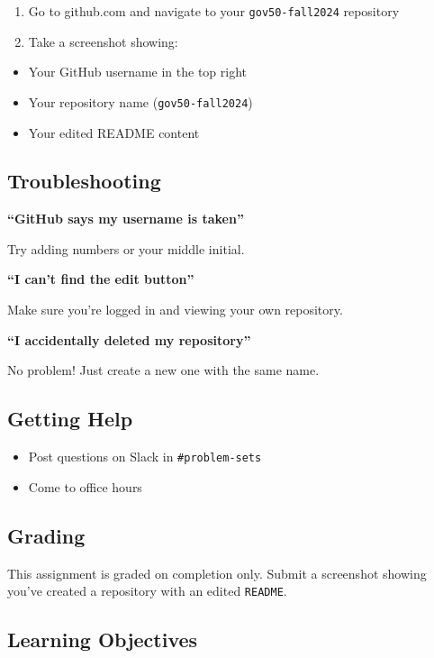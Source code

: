\documentclass[
  11pt,
  letterpaper]{article}
\providecommand{\tightlist}{%
  \setlength{\itemsep}{0pt}\setlength{\parskip}{0pt}}
\begin{document}
\begin{enumerate}
\def\labelenumi{\arabic{enumi}.}
\tightlist
\item
  Go to github.com and navigate to your \texttt{gov50-fall2024}
  repository
\item
  Take a screenshot showing:
\end{enumerate}

\begin{itemize}
\tightlist
\item
  Your GitHub username in the top right
\item
  Your repository name (\texttt{gov50-fall2024})
\item
  Your edited README content
\end{itemize}

\subsection{Troubleshooting}\label{troubleshooting}

\textbf{``GitHub says my username is taken''}

Try adding numbers or your middle initial.

\textbf{``I can't find the edit button''}

Make sure you're logged in and viewing your own repository.

\textbf{``I accidentally deleted my repository''}

No problem! Just create a new one with the same name.

\subsection{Getting Help}\label{getting-help}

\begin{itemize}
\tightlist
\item
  Post questions on Slack in \texttt{\#problem-sets}
\item
  Come to office hours
\end{itemize}

\subsection{Grading}\label{grading}

This assignment is graded on completion only. Submit a screenshot
showing you've created a repository with an edited \texttt{README}.

\subsection{Learning Objectives}\label{learning-objectives}
\end{document}
